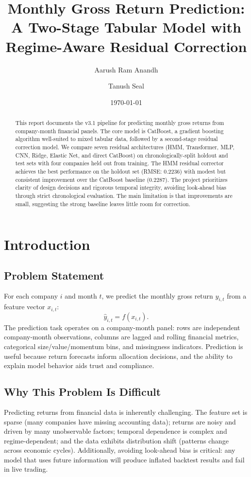 \documentclass[11pt]{article}
\title{Monthly Gross Return Prediction: \\A Two-Stage Tabular Model with Regime-Aware Residual Correction}
\author{Aarush Ram Anandh \and Tanush Seal}
\date{\today}
\begin{document}
\maketitle

\begin{abstract}
This report documents the v3.1 pipeline for predicting monthly gross returns from company-month financial panels. The core model is CatBoost, a gradient boosting algorithm well-suited to mixed tabular data, followed by a second-stage residual correction model. We compare seven residual architectures (HMM, Transformer, MLP, CNN, Ridge, Elastic Net, and direct CatBoost) on chronologically-split holdout and test sets with four companies held out from training. The HMM residual corrector achieves the best performance on the holdout set (RMSE: $0.2236$) with modest but consistent improvement over the CatBoost baseline ($0.2287$). The project prioritizes clarity of design decisions and rigorous temporal integrity, avoiding look-ahead bias through strict chronological evaluation. The main limitation is that improvements are small, suggesting the strong baseline leaves little room for correction.
\end{abstract}

\section{Introduction}

\subsection{Problem Statement}
For each company $i$ and month $t$, we predict the monthly gross return $y_{i,t}$ from a feature vector $x_{i,t}$:
\begin{equation}
\hat{y}_{i,t} = f(x_{i,t}).
\end{equation}
The prediction task operates on a company-month panel: rows are independent company-month observations, columns are lagged and rolling financial metrics, categorical size/value/momentum bins, and missingness indicators. Prediction is useful because return forecasts inform allocation decisions, and the ability to explain model behavior aids trust and compliance.

\subsection{Why This Problem Is Difficult}
Predicting returns from financial data is inherently challenging. The feature set is sparse (many companies have missing accounting data); returns are noisy and driven by many unobservable factors; temporal dependence is complex and regime-dependent; and the data exhibits distribution shift (patterns change across economic cycles). Additionally, avoiding look-ahead bias is critical: any model that uses future information will produce inflated backtest results and fail in live trading.
\end{document}
